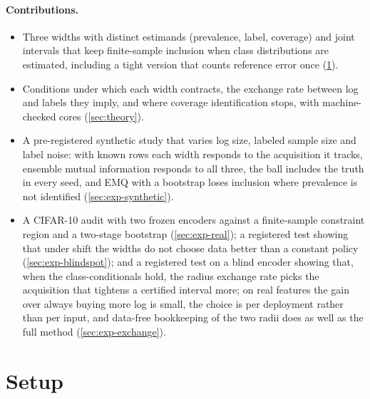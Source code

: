 \documentclass[twoside]{article}
\begin{document}
\paragraph{Contributions.}
\begin{itemize}
\item Three widths with distinct estimands (prevalence, label, coverage) and joint intervals that keep
finite-sample inclusion when class distributions are estimated, including a tight version that counts
reference error once (\cref{sec:setup}).
\item Conditions under which each width contracts, the exchange rate between log and labels they imply,
and where coverage identification stops, with machine-checked cores (\cref{sec:theory}).
\item A pre-registered synthetic study that varies log size, labeled sample size and label noise: with
known rows each width responds to the acquisition it tracks, ensemble mutual information responds to all
three, the ball includes the truth in every seed, and EMQ with a bootstrap loses inclusion where
prevalence is not identified (\cref{sec:exp-synthetic}).
\item A CIFAR-10 audit with two frozen encoders against a finite-sample constraint region and a
two-stage bootstrap (\cref{sec:exp-real}); a registered test showing that under shift the widths do not
choose data better than a constant policy (\cref{sec:exp-blindspot}); and a registered test on a blind
encoder showing that, when the class-conditionals hold, the radius exchange rate picks the acquisition
that tightens a certified interval more; on real features the gain over always buying more log is small,
the choice is per deployment rather than per input, and data-free bookkeeping of the two radii does as
well as the full method (\cref{sec:exp-exchange}).
\end{itemize}
\section{Setup}
\label{sec:setup}
\end{document}
